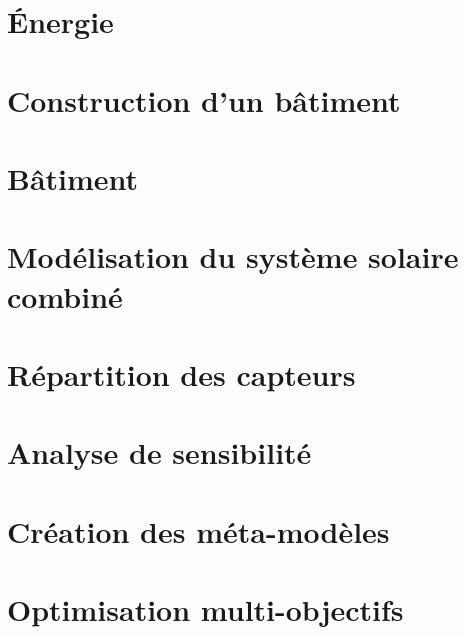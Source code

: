 \documentclass[11pt, twoside, openright]{JeremyThesis}
\begin{document}
\begin{thesisAppendices}

\chapter{Énergie} %
\label{cha:energie}


\chapter{Construction d’un bâtiment} %
\label{cha:construction_batiment}


\chapter{Bâtiment} %
\label{cha:batiment}
\clearpage



\chapter{Modélisation du système solaire combiné} %
\label{cha:systeme_solaire}



\chapter{Répartition des capteurs} %
\label{cha:repartition_des_capteurs}


\chapter{Analyse de sensibilité} %
\label{cha:analyse_de_sensibilite}


\chapter{Création des méta-modèles} %
\label{cha:creation_des_meta_modeles}


\chapter{Optimisation multi-objectifs} %
\label{cha:optimisation_multi_objectifs}


\end{thesisAppendices}


\end{document}
